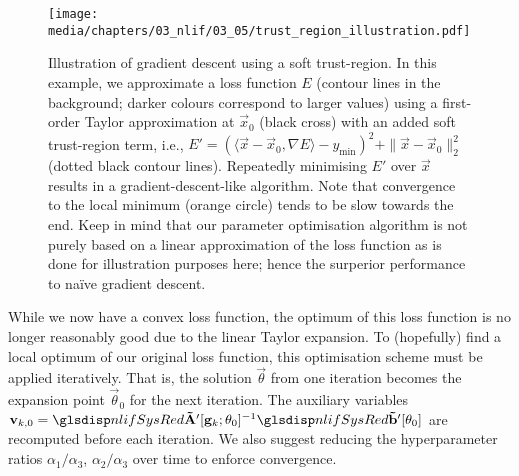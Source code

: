 \begin{figure}[p]
	\centering
	\texttt{[image: media/chapters/03\_nlif/03\_05/trust\_region\_illustration.pdf]}
	\caption[Illustration of gradient descent using a soft trust-region]{Illustration of gradient descent using a soft trust-region.
	In this example, we approximate a loss function $E$ (contour lines in the background; darker colours correspond to larger values) using a first-order Taylor approximation at $\vec x_0$ (black cross) with an added soft trust-region term, i.e., $E' = (\langle \vec x - \vec x_0,  \nabla E \rangle - y_\mathrm{min})^2 + \|\vec x - \vec x_0\|_2^2$ (dotted black contour lines).
	Repeatedly minimising $E'$ over $\vec x$ results in a gradient-descent-like algorithm.
	Note that convergence to the local minimum (orange circle) tends to be slow towards the end.
	Keep in mind that our \nlif parameter optimisation algorithm is not purely based on a linear approximation of the loss function as is done for illustration purposes here; hence the surperior performance to na\"ive gradient descent.
	}
	\label{fig:trust_region}
\end{figure}

While we now have a convex loss function, the optimum of this loss function is no longer reasonably good due to the linear Taylor expansion.
To (hopefully) find a local optimum of our original loss function, this optimisation scheme must be applied iteratively.
That is, the solution $\vec \theta$ from one iteration becomes the expansion point $\vec \theta_0$ for the next iteration.
The auxiliary variables $\vec v_{k, 0} = \mrAp[\vec g_k; \vec \theta_0]^{-1} \vrbp[\vec \theta_0]$ are recomputed before each iteration.
We also suggest reducing the hyperparameter ratios $\alpha_1 / \alpha_3$, $\alpha_2 / \alpha_3$ over time to enforce convergence.


